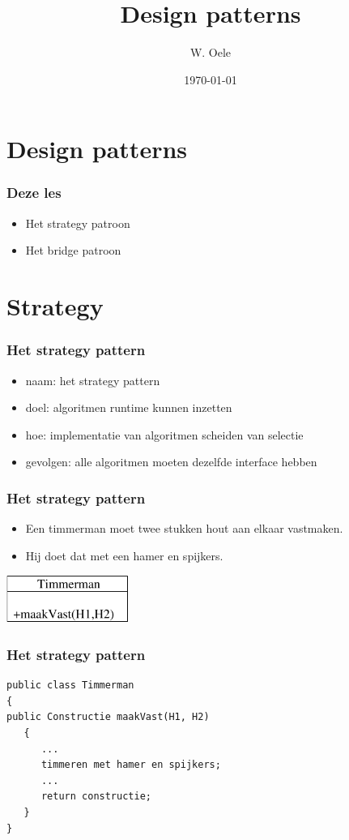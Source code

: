 \documentclass{beamer}
\title{Design patterns}
\author{W. Oele}
\date{\today}
\begin{document}
\frame{\titlepage}

\section{Design patterns}

\begin{frame}
\frametitle{Deze les}
\begin{itemize}
\item Het strategy patroon
\item Het bridge patroon
\end{itemize}
\end{frame}

\section{Strategy}
\begin{frame} \frametitle{Het strategy pattern}
  \begin{itemize}
  \item naam: het strategy pattern
  \item doel: algoritmen runtime kunnen inzetten
  \item hoe: implementatie van algoritmen scheiden van selectie 
  \item gevolgen: alle algoritmen moeten dezelfde interface hebben
  \end{itemize}
\end{frame}


\begin{frame}
\frametitle{Het strategy pattern}
\begin{itemize}
\item Een timmerman moet twee stukken hout aan elkaar vastmaken.
\item Hij doet dat met een hamer en spijkers.
\end{itemize}
\begin{center}
\includegraphics[width=4cm]{timmer1}
\end{center}
\end{frame}

\begin{frame}[fragile]
\frametitle{Het strategy pattern}
\begin{verbatim}
public class Timmerman
{
public Constructie maakVast(H1, H2)
   {
      ...
      timmeren met hamer en spijkers;
      ...
      return constructie;
   }
}
\end{verbatim}
\end{frame}
\end{document}
